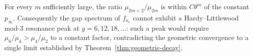 \begin{corollary}
\label{cor:no-mod-3}
For every $m$ sufficiently large, the ratio $\mu_{2m+2}/\mu_{2m}$ is
within $C \theta^m$ of the constant $p_\infty$. Consequently the gap
spectrum of $f_{u_c}$ cannot exhibit a Hardy--Littlewood mod-$3$
resonance peak at $g = 6, 12, 18, \ldots$: such a peak would require
$\mu_6/\mu_4 > \mu_4/\mu_2$ to a constant factor, contradicting the
geometric convergence to a single limit established by Theorem~\ref{thm:geometric-decay}.
\end{corollary}
